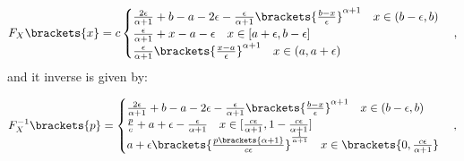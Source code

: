 \begin{align}
    F_X\brackets{x}= c\begin{cases}
                        \frac{2\epsilon}{\alpha+1}+b-a-2\epsilon-\frac{\epsilon}{\alpha+1}\brackets{\frac{b-x}{\epsilon}}^{\alpha+1}\quad x\in (b-\epsilon,b)\\
                        \frac{\epsilon}{\alpha+1}+x-a-\epsilon\quad x\in [a+\epsilon,b-\epsilon] \\
                        \frac{\epsilon}{\alpha+1}\brackets{\frac{x-a}{\epsilon}}^{\alpha+1}\quad x \in (a,a+\epsilon)
    \end{cases},
\end{align}
and it inverse is given by:

\begin{align}
    F_X^{-1}\brackets{p}=\begin{cases}
                        \frac{2\epsilon}{\alpha+1}+b-a-2\epsilon-\frac{\epsilon}{\alpha+1}\brackets{\frac{b-x}{\epsilon}}^{\alpha+1}\quad x\in (b-\epsilon,b)\\
                        \frac{p}{c}+a+\epsilon-\frac{\epsilon}{\alpha+1}\quad x\in [\frac{c\epsilon}{\alpha+1},1-\frac{c\epsilon}{\alpha+1}] \\
                        a+\epsilon\brackets{\frac{p\brackets{\alpha+1}}{c\epsilon}}^{\frac{1}{\alpha+1}}\quad x \in \brackets{0,\frac{c\epsilon}{\alpha+1}}
    \end{cases},
\end{align}